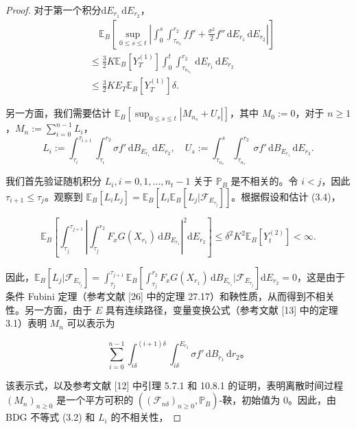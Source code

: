 \begin{proof}
	对于第一个积分$ \mathrm{d}E_{r_1} \, \mathrm{d}E_{r_2}$，
	\begin{align}
		& \quad \mathbb{E}_B \left[\sup_{0 \leq s \leq t} \left| \int_0^s \int_{\tau_{n_2}}^{r_2} ff'  + \frac{\sigma^2}{2} f'' \, \mathrm{d}E_{r_1} \, \mathrm{d}E_{r_2} \right|\right] \nonumber \\
		&\leq  \frac{3}{2}K \mathbb{E}_B[Y_T^{(1)}] \int_0^t \int_{\tau_{n_{r_2}}}^{r_2} \, \mathrm{d}E_{r_1} \, \mathrm{d}E_{r_2} \nonumber \\
		&\leq  \frac{3}{2}K E_T \mathbb{E}_B[Y_T^{(1)}] \delta.  \label{II21}
	\end{align}
	
	另一方面，我们需要估计 $\mathbb{E}_B \left[\sup_{0 \leq s \leq t} |M_{n_s} + U_s|\right]$，其中 $M_0 := 0$，对于 $n \geq 1$，$M_n := \sum_{i=0}^{n-1} L_i$，
	$$
	L_i := \int_{\tau_i}^{\tau_{i+1}} \int_{\tau_i}^{r_2} \sigma f' \, \mathrm{d}B_{E_{r_1}} \, \mathrm{d}E_{r_2}, \quad U_s := \int_{\tau_{n_s}}^s \int_{\tau_{n_s}}^{r_2} \sigma f' \, \mathrm{d}B_{E_{r_1}} \, \mathrm{d}E_{r_2}.
	$$
	
	我们首先验证随机积分 $L_i, i=0,1,\ldots,n_t-1$ 关于 $\mathbb{P}_B$ 是不相关的。令 $i < j$，因此 $\tau_{i+1} \leq \tau_j$。观察到 $\mathbb{E}_B [L_i L_j] = \mathbb{E}_B \left[L_i \mathbb{E}_B [L_j | \mathcal{F}_{E_{\tau_j}}]\right]$。根据假设和估计 (3.4)，
	
	$$
	\mathbb{E}_B \left[\int_{\tau_j}^{\tau_{j+1}} \left|\int_{\tau_j}^{r_2} F_x G( X_{r_1}) \, \mathrm{d}B_{E_{r_1}}\right|^2 \mathrm{d}E_{r_2}\right] \leq \delta^2 K^2 \mathbb{E}_B [Y_t^{(2)}] < \infty.
	$$
	
	因此，$\mathbb{E}_B \left[L_j | \mathcal{F}_{E_{\tau_j}}\right] = \int_{\tau_j}^{\tau_{j+1}} \mathbb{E}_B \left[\int_{\tau_j}^{r_2} F_x G(X_{r_1}) \, \mathrm{d}B_{E_{r_1}} | \mathcal{F}_{E_{\tau_j}}\right] \mathrm{d}E_{r_2} = 0$，这是由于条件 Fubini 定理（参考文献 [26] 中的定理 27.17）和鞅性质，从而得到不相关性。另一方面，由于 $E$ 具有连续路径，变量变换公式（参考文献 [13] 中的定理 3.1）表明 $M_n$ 可以表示为
	
	$$
	\sum_{i=0}^{n-1} \int_{i\delta}^{(i+1)\delta} \int_{i\delta}^{E_{r_2}} \sigma f' \, \mathrm{d}B_{r_1} \, \mathrm{d}r_2。
	$$
	
	该表示式，以及参考文献 [12] 中引理 5.7.1 和 10.8.1 的证明，表明离散时间过程 $(M_n)_{n \geq 0}$ 是一个平方可积的 $((\mathcal{F}_{n\delta})_{n \geq 0}, \mathbb{P}_B)$-鞅，初始值为 0。因此，由 BDG 不等式 (3.2) 和 $L_i$ 的不相关性，
	

\end{proof}
